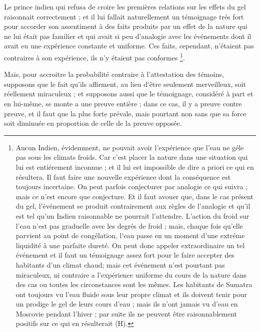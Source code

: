 Le prince indien qui refusa de croire les premières
relations sur les effets du gel raisonnait correctement ;
et il lui fallait naturellement un témoignage trés fort
pour accorder son assentiment à des faits produits par un
effet de la nature qui ne lui était pas familier et qui avait
si peu d’analogie avec les événements dont il avait eu une
expérience constante et uniforme. Ces faits, cependant,
n’étaient pas contraires à son expérience, ils n’y étaient
pas conformes \footnote{Aucun Indien, évidemment, ne pouvait avoir l’expérience
que l’eau ne géle pas sous les climats froids. Car c’est placer la
nature dans une situation qui lui est entiérement inconnue ;
et il lui est impossible de dire a priori ce qui en résultera. Il
faut faire une nouvelle expérience dont la conséquence est
toujours incertaine. On peut parfois conjecturer par analogie
ce qui suivra ; mais ce n’est encore que conjecture. Et il faut
avouer que, dans le cas présent du gel, l’événement se produit
contrairement aux règles de l’analogie et qu’il est tel qu’un
Indien raisonnable ne pourrait l’attendre. L’action du froid sur
l'eau n’est pas graduelle avec les degrés de froid ; mais, chaque
fois qu’elle parvient au point de congélation, l’eau passe en un
moment d’une extréme liquidité à une parfaite dureté. On
peut donc appeler extraordinaire un tel événement et il faut un
témoignage assez fort pour le faire accepter des habitants d’un
climat chaud; mais cet événement n’est pourtant pas miraculeux,
ni contraire a l’expérience uniforme du cours de la nature
dans des cas ou toutes les circonstances sont les mêmes. Les
habitants de Sumatra ont toujours vu l’eau fluide sous leur
propre climat et ils doivent tenir pour un prodige le gel de leurs
cours d’eau ; mais ils n’ont jamais vu d’eau en Moscovie pendant
l'hiver ; par suite ils ne peuvent être raisonnablement positifs
sur ce qui en résulterait (H).}.

Mais, pour accroitre la probabilité contraire à l’attestation
des témoins, supposons que le fait qu’ils affirment,
au lieu d’être seulement merveilleux, soit réellement
miraculeux ; et supposons aussi que le témoignage, considéré
à part et en lui-même, se monte a une preuve entière ;
dans ce cas, il y a preuve contre preuve, et il faut que la
plus forte prévale, mais pourtant non sans que sa force
soit diminuée en proportion de celle de la preuve opposée.

